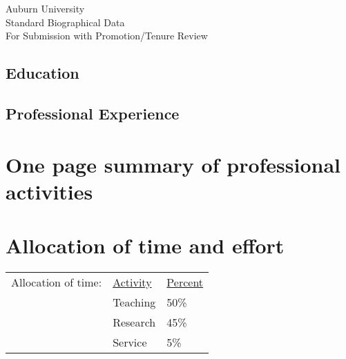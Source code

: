


\newcommand{\longcontent}[1]{}

\newcommand{\oldcontent}[1]{}

\newcommand{\docTitle}{Biographical Data\xspace}


\singlespacing

\newpage


\bigskip
\begin{mytitle}
    Auburn University \\
    Standard Biographical Data \\
    For Submission with Promotion/Tenure Review
\end{mytitle}

\bigskip


\bigskip
\subsection*{Education}


\bigskip
\subsection*{Professional Experience}


\newpage

\section{One page summary of professional activities}



\newpage


\section{Allocation of time and effort}
\begin{tabular}{ l l l }
    Allocation of time: & \underline{Activity} & \underline{Percent} \\
    & Teaching & 50\% \\
    & Research & 45\% \\
    & Service & 5\% \\
\end{tabular}


